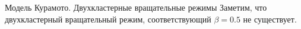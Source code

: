 \begin{chapter}{Модель Курамото. Двухкластерные вращательные режимы}
	Заметим, что двухкластерный вращательный режим, соответствующий
	$\beta = 0.5$ не существует.


\end{chapter}